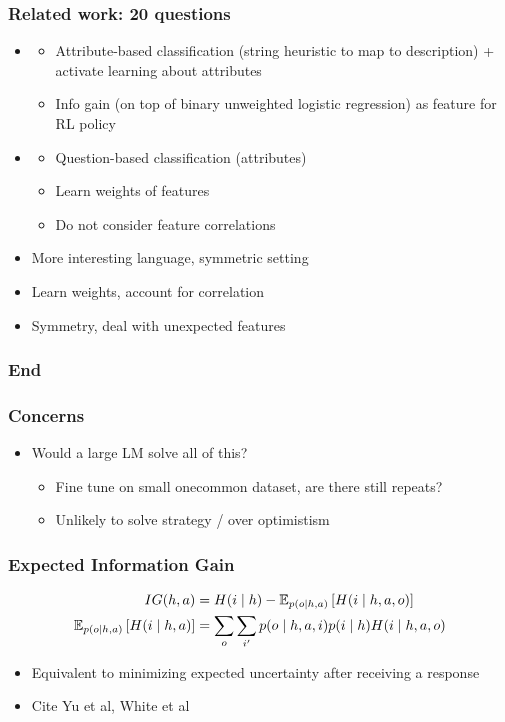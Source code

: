 \documentclass{beamer}
\begin{document}
\begin{frame}
\frametitle{Related work: 20 questions}
\begin{itemize}
\item \citet{padmakumar}
    \begin{itemize}
    \item Attribute-based classification (string heuristic to map to description)
        + activate learning about attributes
    \item Info gain (on top of binary unweighted logistic regression) as feature for
        RL policy
    \end{itemize}
\item \citet{yu}
    \begin{itemize}
    \item Question-based classification (attributes)
    \item Learn weights of features
    \item Do not consider feature correlations
    \end{itemize}
\item More interesting language, symmetric setting
\item Learn weights, account for correlation
\item Symmetry, deal with unexpected features
\end{itemize}
\end{frame}

\begin{frame}
\frametitle{End}
\end{frame}


\begin{frame}
\frametitle{Concerns}
\begin{itemize}
\item Would a large LM solve all of this?
    \begin{itemize}
    \item Fine tune on small onecommon dataset, are there still repeats?
    \item Unlikely to solve strategy / over optimistism
    \end{itemize}
\end{itemize}
\end{frame}


\begin{frame}
\frametitle{Expected Information Gain}
\begin{align*}
IG(h, a) &= H(i \mid h) - \mathbb{E}_{p(o\mid h,a)}\left[H(i \mid h, a, o)\right]\\
\mathbb{E}_{p(o\mid h,a)}\left[H(i \mid h, a)\right] &= \sum_o\sum_{i'}p(o\mid h,a,i)p(i\mid h)H(i \mid h,a,o)
\end{align*}
\begin{itemize}
\item Equivalent to minimizing expected uncertainty after receiving a response
\item Cite Yu et al, White et al
\end{itemize}
\end{frame}
\end{document}

